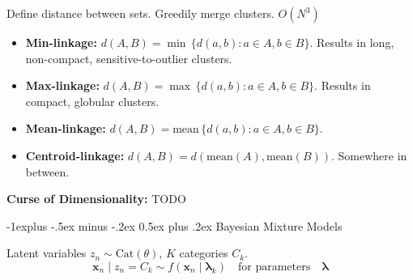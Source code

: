\documentclass[10pt,landscape]{article}
\makeatletter
\renewcommand{\subsection}{\@startsection{subsection}{2}{0mm}%
                                {-1explus -.5ex minus -.2ex}%
                                {0.5ex plus .2ex}%
                                {\normalfont\normalsize\bfseries}}
\makeatother
\begin{document}
\begin{multicols*}{3}
	Define distance between sets. Greedily merge clusters. {\color{red} $O(N^3)$}
	\begin{itemize}
		\item \textbf{Min-linkage:} $d(A,B)=\min\,\{d(a,b) : a\in A, b\in B\}$.
			      {\color{red} Results in long, non-compact, sensitive-to-outlier clusters.}
		\item \textbf{Max-linkage:} $d(A,B)=\max\,\{d(a,b) : a\in A, b\in B\}$.
			      {\color{red} Results in compact, globular clusters.}
		\item \textbf{Mean-linkage:} $d(A,B)=\textrm{mean}\,\{d(a,b) : a\in A, b\in B\}$.
		\item \textbf{Centroid-linkage:} $d(A,B)=d(\textrm{mean}(A), \textrm{mean}(B))$.
			      {\color{red} Somewhere in between.}
	\end{itemize}

	\textbf{Curse of Dimensionality:} {\color{green} TODO}

	\subsection{Bayesian Mixture Models}
	\begin{minipage}{\linewidth}
		\centering
	\end{minipage} \vspace{-0.25 cm}

	Latent variables $z_n\sim \textrm{Cat}({\theta})$, $K$ categories $C_k$.
	\[
		\mathbf{x}_n \mid z_n = C_k \sim f(\mathbf{x}_n \mid \pmb{\lambda}_k)\quad\textrm{for parameters}\quad\pmb{\lambda}
	\]


\end{multicols*}
\end{document}
